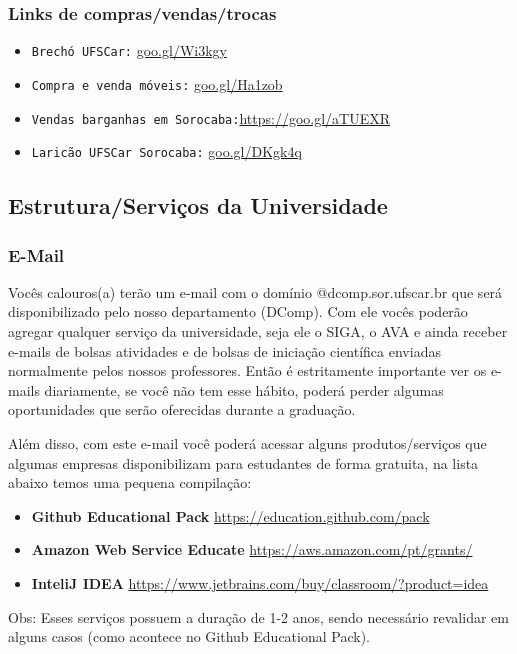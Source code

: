\subsubsection{Links de compras/vendas/trocas}
  \begin{itemize}
    \item \texttt{Brechó UFSCar:} \url{goo.gl/Wi3kgy}
    \item \texttt{Compra e venda móveis:} \url{goo.gl/Ha1zob}
    \item \texttt{Vendas barganhas em Sorocaba:}\url{https://goo.gl/aTUEXR}
    \item \texttt{Laricão UFSCar Sorocaba:} \url{goo.gl/DKgk4q}
  \end{itemize}

\subsection{Estrutura/Serviços da Universidade}

\subsubsection{E-Mail}
Vocês calouros(a) terão um e-mail com o domínio @dcomp.sor.ufscar.br que será disponibilizado pelo nosso departamento (DComp). Com ele vocês poderão agregar qualquer serviço da universidade, seja ele o SIGA, o AVA e ainda receber e-mails de bolsas atividades e de bolsas de iniciação científica enviadas normalmente pelos nossos professores. Então é estritamente importante ver os e-mails diariamente, se você não tem esse hábito, poderá perder algumas oportunidades que serão oferecidas durante a graduação.

Além disso, com este e-mail você poderá acessar alguns produtos/serviços que algumas empresas disponibilizam para estudantes de forma gratuita, na lista abaixo temos uma pequena compilação:
\begin{itemize}
  \item \textbf{Github Educational Pack} \url{https://education.github.com/pack}
  \item \textbf{Amazon Web Service Educate} \url{https://aws.amazon.com/pt/grants/}
  \item \textbf{InteliJ IDEA} \url{https://www.jetbrains.com/buy/classroom/?product=idea}
\end{itemize}

Obs: Esses serviços possuem a duração de 1-2 anos, sendo necessário revalidar em alguns casos (como acontece no Github Educational Pack).

